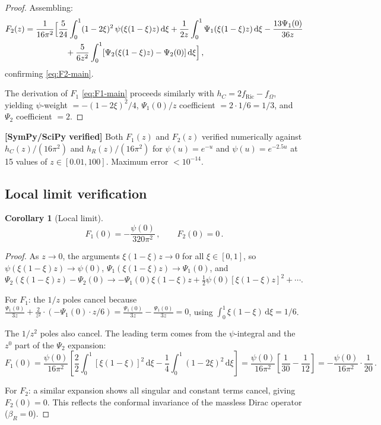 \documentclass[11pt,a4paper]{article}
\renewcommand{\dd}{\mathrm{d}}
\newtheorem{corollary}[theorem]{Corollary}
\theoremstyle{definition}
\theoremstyle{remark}
\newcommand{\verified}[1]{%
  \par\noindent\colorbox{green!10}{%
    \parbox{\dimexpr\linewidth-2\fboxsep}{%
      \textcolor{green!50!black}{\textbf{[SymPy/SciPy verified]}}
      \textcolor{green!50!black}{#1}%
    }%
  }\par%
}
\begin{document}
\begin{proof}
\medskip
Assembling:
\begin{align*}
  F_2(z) &= \frac{1}{16\pi^2}\Bigl[
  \frac{5}{24}\int_0^1(1-2\xi)^2\,\psi(\xi(1-\xi)z)\,\dd\xi
  + \frac{1}{2z}\int_0^1\Psi_1(\xi(1-\xi)z)\,\dd\xi
  - \frac{13\Psi_1(0)}{36z}\\
  &\qquad\qquad\quad
  + \frac{5}{6z^2}\int_0^1[\Psi_2(\xi(1-\xi)z)-\Psi_2(0)]\,\dd\xi
  \Bigr]\,,
\end{align*}
confirming \eqref{eq:F2-main}.

The derivation of $F_1$ \eqref{eq:F1-main} proceeds similarly with
$h_C = 2f_{\text{Ric}} - f_\Omega$, yielding
$\psi$-weight $= -(1-2\xi)^2/4$,
$\Psi_1(0)/z$ coefficient $= 2\cdot 1/6 = 1/3$, and
$\Psi_2$ coefficient $= 2$.
\end{proof}

\verified{%
Both $F_1(z)$ and $F_2(z)$ verified numerically against
$h_C(z)/(16\pi^2)$ and $h_R(z)/(16\pi^2)$ for
$\psi(u) = e^{-u}$ and $\psi(u) = e^{-2.5u}$ at 15 values of
$z \in [0.01, 100]$.  Maximum error $< 10^{-14}$.}


\subsection{Local limit verification}

\begin{corollary}[Local limit]
\label{cor:local}
\begin{equation}
  F_1(0) = -\frac{\psi(0)}{320\pi^2}\,,\qquad
  F_2(0) = 0\,.
  \label{eq:local-limit}
\end{equation}
\end{corollary}

\begin{proof}
As $z \to 0$, the arguments $\xi(1-\xi)z \to 0$ for all
$\xi \in [0,1]$, so $\psi(\xi(1-\xi)z) \to \psi(0)$,
$\Psi_1(\xi(1-\xi)z) \to \Psi_1(0)$, and
$\Psi_2(\xi(1-\xi)z) - \Psi_2(0) \to
-\Psi_1(0)\xi(1-\xi)z + \frac{1}{2}\psi(0)[\xi(1-\xi)z]^2 + \cdots$.

For $F_1$: the $1/z$ poles cancel because
$\frac{\Psi_1(0)}{3z} + \frac{2}{z^2}\cdot(-\Psi_1(0)\cdot z/6)
= \frac{\Psi_1(0)}{3z} - \frac{\Psi_1(0)}{3z} = 0$,
using $\int_0^1\xi(1-\xi)\,\dd\xi = 1/6$.

The $1/z^2$ poles also cancel. The leading term comes from the
$\psi$-integral and the $z^0$ part of the $\Psi_2$ expansion:
\begin{equation*}
  F_1(0) = \frac{\psi(0)}{16\pi^2}\left[
  \frac{2}{2}\int_0^1[\xi(1-\xi)]^2\,\dd\xi
  - \frac{1}{4}\int_0^1(1-2\xi)^2\,\dd\xi
  \right]
  = \frac{\psi(0)}{16\pi^2}\left[\frac{1}{30} - \frac{1}{12}\right]
  = -\frac{\psi(0)}{16\pi^2}\cdot\frac{1}{20}\,.
\end{equation*}

For $F_2$: a similar expansion shows all singular and constant terms
cancel, giving $F_2(0) = 0$.  This reflects the conformal invariance
of the massless Dirac operator ($\beta_R = 0$).
\end{proof}
\end{document}
